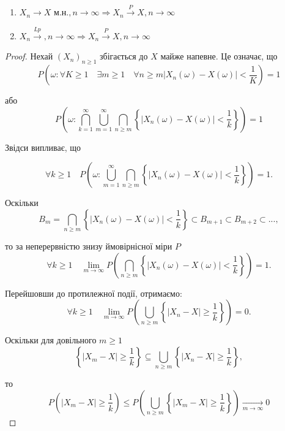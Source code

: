 \begin{theorem}~
    \begin{enumerate}
        \item $X_n \rightarrow X \text{ м.н.}, n \rightarrow \infty 
            \Rightarrow X_n \xrightarrow{P} X, n \rightarrow \infty$
        
        \item $X_n \xrightarrow{Lp}, n \rightarrow \infty 
            \Rightarrow X_n \xrightarrow{P} X, n \rightarrow \infty$
    \end{enumerate}
\end{theorem}
\begin{proof}
    Нехай $(X_n)_{n \geqslant 1}$ збігається до $X$ майже напевне.
    Це означає, що
    $$P(\omega: \forall K \geqslant 1
        \quad \exists m \geqslant 1
        \quad \forall n \geqslant m
        |X_n (\omega) - X (\omega)| < \frac{1}{K}) = 1$$

    або 
    $$P\left(\omega: \bigcap\limits_{k=1}^{\infty} \bigcup\limits_{m=1}^{\infty} \bigcap\limits_{n \geqslant m }
        \left\{ \left|X_n(\omega) - X(\omega)\right| < \frac{1}{k} \right\}\right) = 1$$
        
    Звідси випливає, що 

    $$\forall k \geqslant 1 \quad P\left(\omega: 
        \bigcup\limits_{m=1}^{\infty} \bigcap\limits_{n \geqslant m }
        \left\{ \left|X_n(\omega) - X(\omega)\right| < \frac{1}{k} \right\}\right) = 1.$$

    Оскільки
    $$B_m = \bigcap\limits_{n \geqslant m} \left\{ |X_n(\omega) - X(\omega)| < \frac{1}{k}  \right\}
    \subset B_{m+1} \subset B_{m+2} \subset ...,$$
    
    то за неперервністю знизу ймовірнісної міри $P$
    $$\forall k  \geqslant 1 \quad \lim\limits_{m \rightarrow \infty} 
        P(\bigcap_{n \geqslant m} \left\{ |X_n(\omega) - X(\omega)| < \frac{1}{k} \right\}) = 1.$$

    Перейшовши до протилежної події, отримаємо:
    $$\forall k  \geqslant 1 \quad \lim\limits_{m \rightarrow \infty} 
        P(\bigcup_{n \geqslant m} \left\{ |X_n - X| \geqslant \frac{1}{k} \right\}) = 0.$$

    Оскільки для довільного $m \geqslant 1$
    $$\left\{ |X_m - X| \geqslant \frac{1}{k} \right\}
        \subseteq \bigcup\limits_{n \geqslant m}
            \left\{ |X_n - X| \geqslant \frac{1}{k} \right\},$$

    то
    $$P\left( |X_m - X| \geqslant \frac{1}{k} \right)
        \leqslant P\left( \bigcup\limits_{n \geqslant m} \left\{ |X_m - X| \geqslant \frac{1}{k} \right\} \right)
            \xrightarrow[m \rightarrow \infty]{}0$$


\end{proof}

